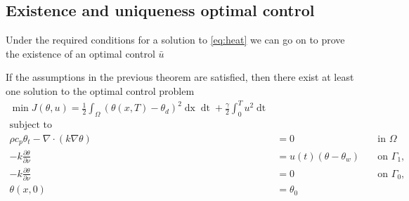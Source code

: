 \subsection{Existence and uniqueness optimal control}
Under the required conditions for a solution to \eqref{eq:heat} we can go on to prove the existence of an optimal control $\bar{u}$
\begin{theorem}
If the assumptions in the previous theorem are satisfied, then there exist at least one solution to the optimal control problem 
\begin{align*}
       \min J(\theta, u) = \frac{1}{2} \int_\Omega (\theta(x, T) - \theta_d)^2 \mathop{dx} \mathop{dt} + \frac{\gamma}{2} \int_0^{T} u^2 \mathop{dt} \\
       \text{subject to} \\
       \rho c_p \theta_t - \nabla \cdot (k \nabla \theta) &= 0 \quad &\text{in } \Omega  \\
      -k \frac{\partial \theta}{\partial \nu} &= u(t) (\theta - \theta_w) \quad &\text{on } \Gamma_1, \\
      -k \frac{\partial \theta}{\partial \nu} &= 0 \quad &\text{on } \Gamma_0, \\
      \theta(x, 0) &= \theta_0 &
\end{align*}
\end{theorem}

